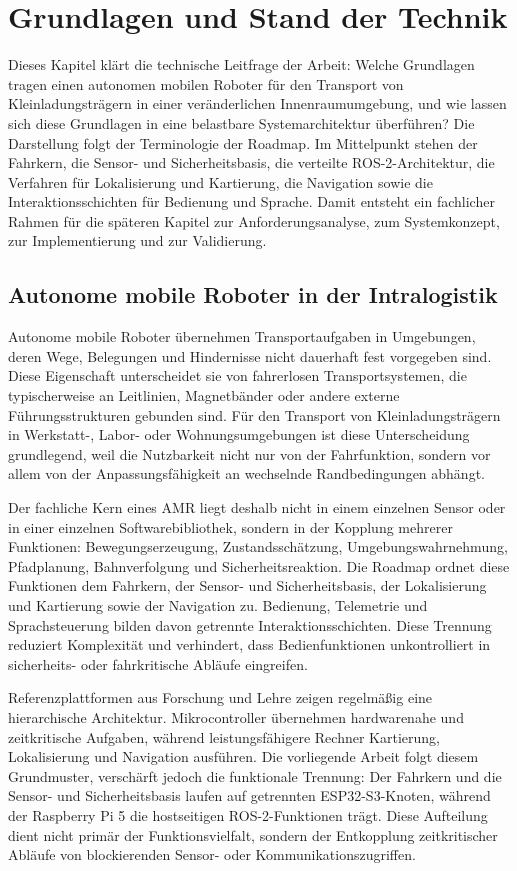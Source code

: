 \chapter{Grundlagen und Stand der Technik}

Dieses Kapitel klärt die technische Leitfrage der Arbeit: Welche Grundlagen tragen einen autonomen mobilen Roboter für den Transport von Kleinladungsträgern in einer veränderlichen Innenraumumgebung, und wie lassen sich diese Grundlagen in eine belastbare Systemarchitektur überführen? Die Darstellung folgt der Terminologie der Roadmap. Im Mittelpunkt stehen der Fahrkern, die Sensor- und Sicherheitsbasis, die verteilte ROS-2-Architektur, die Verfahren für Lokalisierung und Kartierung, die Navigation sowie die Interaktionsschichten für Bedienung und Sprache. Damit entsteht ein fachlicher Rahmen für die späteren Kapitel zur Anforderungsanalyse, zum Systemkonzept, zur Implementierung und zur Validierung.

\section{Autonome mobile Roboter in der Intralogistik}

Autonome mobile Roboter übernehmen Transportaufgaben in Umgebungen, deren Wege, Belegungen und Hindernisse nicht dauerhaft fest vorgegeben sind. Diese Eigenschaft unterscheidet sie von fahrerlosen Transportsystemen, die typischerweise an Leitlinien, Magnetbänder oder andere externe Führungsstrukturen gebunden sind. Für den Transport von Kleinladungsträgern in Werkstatt-, Labor- oder Wohnungsumgebungen ist diese Unterscheidung grundlegend, weil die Nutzbarkeit nicht nur von der Fahrfunktion, sondern vor allem von der Anpassungsfähigkeit an wechselnde Randbedingungen abhängt.

Der fachliche Kern eines AMR liegt deshalb nicht in einem einzelnen Sensor oder in einer einzelnen Softwarebibliothek, sondern in der Kopplung mehrerer Funktionen: Bewegungserzeugung, Zustandsschätzung, Umgebungswahrnehmung, Pfadplanung, Bahnverfolgung und Sicherheitsreaktion. Die Roadmap ordnet diese Funktionen dem Fahrkern, der Sensor- und Sicherheitsbasis, der Lokalisierung und Kartierung sowie der Navigation zu. Bedienung, Telemetrie und Sprachsteuerung bilden davon getrennte Interaktionsschichten. Diese Trennung reduziert Komplexität und verhindert, dass Bedienfunktionen unkontrolliert in sicherheits- oder fahrkritische Abläufe eingreifen.

Referenzplattformen aus Forschung und Lehre zeigen regelmäßig eine hierarchische Architektur. Mikrocontroller übernehmen hardwarenahe und zeitkritische Aufgaben, während leistungsfähigere Rechner Kartierung, Lokalisierung und Navigation ausführen. Die vorliegende Arbeit folgt diesem Grundmuster, verschärft jedoch die funktionale Trennung: Der Fahrkern und die Sensor- und Sicherheitsbasis laufen auf getrennten ESP32-S3-Knoten, während der Raspberry Pi 5 die hostseitigen ROS-2-Funktionen trägt. Diese Aufteilung dient nicht primär der Funktionsvielfalt, sondern der Entkopplung zeitkritischer Abläufe von blockierenden Sensor- oder Kommunikationszugriffen.

